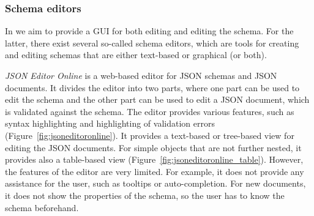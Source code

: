 \subsubsection{Schema editors}\label{subsubsec:schema-editors}
In \toolname{} we aim to provide a GUI for both editing \cfgfiles{} and editing the schema.
For the latter, there exist several so-called schema editors, which are tools for creating and editing schemas that are
either text-based or graphical (or both).

\textit{JSON Editor Online}\cite{jsoneditoronlineJSONEditor} is a web-based editor for JSON schemas and JSON documents.
It divides the editor into two parts, where one part can be used to edit the schema and the other part can be used to edit a JSON document,
which is validated against the schema.
The editor provides various features, such as syntax highlighting and highlighting of validation errors (Figure~\ref{fig:jsoneditoronline}).
It provides a text-based or tree-based view for editing the JSON documents.
For simple objects that are not further nested, it provides also a table-based view (Figure~\ref{fig:jsoneditoronline_table}).
However, the features of the editor are very limited.
For example, it does not provide any assistance for the user, such as tooltips or auto-completion.
For new documents, it does not show the properties of the schema, so the user has to know the schema beforehand.

